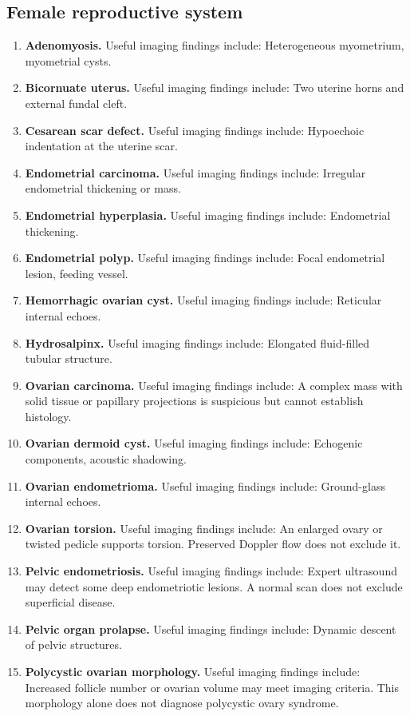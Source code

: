 \subsection{Female reproductive system}
\begin{enumerate}[leftmargin=*,itemsep=0.45em,topsep=0.4em]
\item \textbf{Adenomyosis.} Useful imaging findings include: Heterogeneous myometrium, myometrial cysts.
\item \textbf{Bicornuate uterus.} Useful imaging findings include: Two uterine horns and external fundal cleft.
\item \textbf{Cesarean scar defect.} Useful imaging findings include: Hypoechoic indentation at the uterine scar.
\item \textbf{Endometrial carcinoma.} Useful imaging findings include: Irregular endometrial thickening or mass.
\item \textbf{Endometrial hyperplasia.} Useful imaging findings include: Endometrial thickening.
\item \textbf{Endometrial polyp.} Useful imaging findings include: Focal endometrial lesion, feeding vessel.
\item \textbf{Hemorrhagic ovarian cyst.} Useful imaging findings include: Reticular internal echoes.
\item \textbf{Hydrosalpinx.} Useful imaging findings include: Elongated fluid-filled tubular structure.
\item \textbf{Ovarian carcinoma.} Useful imaging findings include: A complex mass with solid tissue or papillary projections is suspicious but cannot establish histology.
\item \textbf{Ovarian dermoid cyst.} Useful imaging findings include: Echogenic components, acoustic shadowing.
\item \textbf{Ovarian endometrioma.} Useful imaging findings include: Ground-glass internal echoes.
\item \textbf{Ovarian torsion.} Useful imaging findings include: An enlarged ovary or twisted pedicle supports torsion. Preserved Doppler flow does not exclude it.
\item \textbf{Pelvic endometriosis.} Useful imaging findings include: Expert ultrasound may detect some deep endometriotic lesions. A normal scan does not exclude superficial disease.
\item \textbf{Pelvic organ prolapse.} Useful imaging findings include: Dynamic descent of pelvic structures.
\item \textbf{Polycystic ovarian morphology.} Useful imaging findings include: Increased follicle number or ovarian volume may meet imaging criteria. This morphology alone does not diagnose polycystic ovary syndrome.

\end{enumerate}
